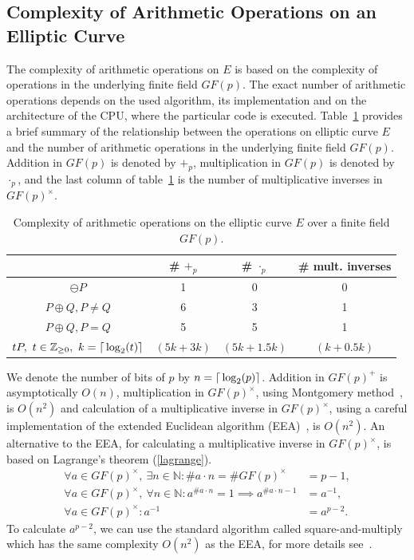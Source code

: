 \documentclass[thesis=M,english]{FITthesis}[2012/10/20]
\theoremstyle{remark}
\theoremstyle{definition}
\begin{document}
\subsection{Complexity of Arithmetic Operations on an Elliptic Curve} 
The complexity of arithmetic operations on $E$ is based on the complexity of operations in the underlying finite field $GF(p)$. The exact number of arithmetic operations depends on the used algorithm, its implementation and on the architecture of the CPU, where the particular code is executed. Table~\ref{tblComp} provides a brief summary of the relationship between the operations on elliptic curve $E$ and the number of arithmetic operations in the underlying finite field $GF(p)$. Addition in $GF(p)$ is denoted by $+_p$, multiplication in $GF(p)$ is denoted by $\cdot_p$, and the last column of table~\ref{tblComp} is the number of multiplicative inverses in $GF(p)^{\times}$.
\begin{table}[H]
\centering
\begin{tabular}{ |c||c|c|c| } 
 \hline
 & \# $+_p$ & \# $\cdot_p$ & \# mult. inverses \\ 
 \hline
 \hline
$\ominus P$ & 1 & 0 & 0  \\  \hline
$P \oplus Q, P \neq Q$ & 6 & 3 & 1 \\  \hline
$P \oplus Q, P = Q$ & 5 & 5 & 1 \\  \hline
$tP,\ t \in \mathbb{Z}_{\geq 0},\ k = \mathlarger{\lceil} \log_2(t) \mathlarger{\rceil}$\footnotemark & $ (5k + 3k)$ & $(5k + 1.5k)$ & $(k + 0.5k)$ \\ \hline
\end{tabular}
\caption[Complexity of arithmetic operations on $E$]{Complexity of arithmetic operations on the elliptic curve $E$ over a finite field $GF(p)$.}
\label{tblComp}
\end{table}
\noindent We denote the number of bits of $p$ by $n = \mathlarger{\lceil} \log_2(p) \mathlarger{\rceil}$. Addition in $GF(p)^{+}$ is asymptotically $O(n)$, multiplication in $GF(p)^{\times}$, using Montgomery method~\cite{handbook}, is $O(n^2)$ and calculation of a multiplicative inverse in $GF(p)^{\times}$, using a careful implementation of the extended Euclidean algorithm (EEA)~\cite{handbook}, is $O(n^2)$. An alternative to the EEA, for calculating a multiplicative inverse in $GF(p)^{\times}$, is based on Lagrange's theorem (\ref{lagrange}). 
\begin{align*}
\forall a \in GF(p)^{\times},\ \exists n \in \mathbb{N}: \#a \cdot n = \#GF(p)^{\times} &= p - 1, \\ 
\forall a \in GF(p)^{\times},\ \forall n \in \mathbb{N}: a^{\#a \cdot n} = 1 \implies a^{\#a \cdot n - 1} &= a^{-1}, \\
\forall a \in GF(p)^{\times}: a^{-1} &= a^{p-2}.
\end{align*}
To calculate $a^{p-2}$, we can use the standard algorithm called square-and-multiply which has the same complexity $O(n^2)$ as the EEA, for more details see~\cite{mky}.
\end{document}
